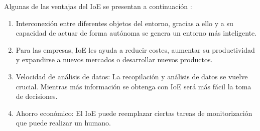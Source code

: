 
Algunas de las ventajas del IoE se presentan a continuación \cite{IoEOpenMindDos}  \cite{IoEEspana} : \\

\begin{enumerate}
\item Interconexión entre diferentes objetos del entorno,  gracias a ello y a su capacidad de actuar de forma autónoma se genera un entorno más inteligente.
\item Para las empresas, IoE les ayuda a reducir costes, aumentar su productividad y expandirse a nuevos mercados o desarrollar nuevos productos. 
\item Velocidad de análisis de datos: La recopilación y análisis de datos se vuelve crucial. Mientras más información se obtenga con IoE será más fácil la toma de decisiones.
\item Ahorro económico:  El IoE puede reemplazar ciertas tareas de monitorización que puede realizar un humano.
\end{enumerate}
